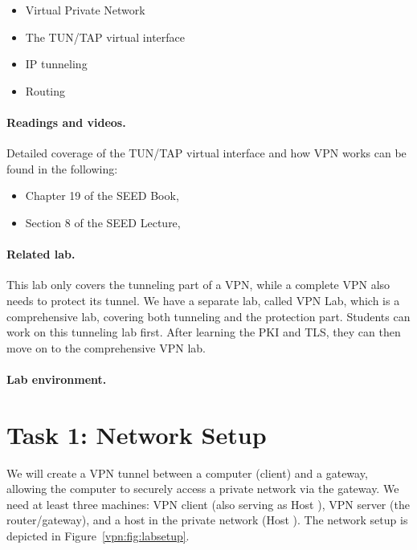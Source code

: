 \begin{itemize}[noitemsep]
\item Virtual Private Network
\item The TUN/TAP virtual interface 
\item IP tunneling 
\item Routing
\end{itemize}


\paragraph{Readings and videos.}
Detailed coverage of the TUN/TAP virtual interface and how 
VPN works can be found in the following:

\begin{itemize}
\item Chapter 19 of the SEED Book, \seedbook
\item Section 8 of the SEED Lecture, \seedisvideo
\end{itemize}


\paragraph{Related lab.}
This lab only covers the tunneling part of a VPN, while 
a complete VPN also needs to protect its tunnel. 
We have a separate lab, called VPN Lab, which
is a comprehensive lab, covering both tunneling and 
the protection part. Students can work on this tunneling
lab first. After learning the PKI and TLS, 
they can then move on to the comprehensive VPN lab.


\paragraph{Lab environment.} \seedenvironmentC




\newpage
\section{Task 1: Network Setup }


We will create a VPN tunnel between a 
computer (client) and a gateway, allowing the computer to securely access 
a private network via the gateway. 
We need at least three machines: VPN client (also serving as Host \hostu), 
VPN server (the router/gateway), and a host in the private network (Host \hostv). 
The network setup is depicted in 
Figure~\ref{vpn:fig:labsetup}.



